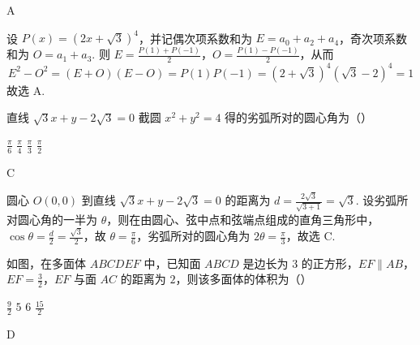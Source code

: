 \begin{answer}
A
\end{answer}

\begin{solution}
设 \(P(x)=(2x+\sqrt{3})^4\)，并记偶次项系数和为 \(E=a_0+a_2+a_4\)，奇次项系数和为 \(O=a_1+a_3\). 则
\(E=\frac{P(1)+P(-1)}{2}\)，\(O=\frac{P(1)-P(-1)}{2}\)，从而
\[
E^2-O^2=(E+O)(E-O)=P(1)P(-1)=(2+\sqrt{3})^4(\sqrt{3}-2)^4=1
\]
故选 A.
\end{solution}

\begin{problem}
直线 \(\sqrt{3}x+y-2\sqrt{3}=0\) 截圆 \(x^{2}+y^{2}=4\) 得的劣弧所对的圆心角为（\quad）

\choices
    {\(\frac{\pi}{6}\)}
    {\(\frac{\pi}{4}\)}
    {\(\frac{\pi}{3}\)}
    {\(\frac{\pi}{2}\)}
\end{problem}

\begin{answer}
C
\end{answer}

\begin{solution}
圆心 \(O(0,0)\) 到直线 \(\sqrt{3}x+y-2\sqrt{3}=0\) 的距离为
\(d=\frac{2\sqrt{3}}{\sqrt{3+1}}=\sqrt{3}\).
设劣弧所对圆心角的一半为 \(\theta\)，则在由圆心、弦中点和弦端点组成的直角三角形中，
\(\cos\theta=\frac{d}{2}=\frac{\sqrt{3}}{2}\)，故 \(\theta=\frac{\pi}{6}\)，劣弧所对的圆心角为 \(2\theta=\frac{\pi}{3}\)，故选 C.
\end{solution}

\begin{problem}
如图，在多面体 \(ABCDEF\) 中，已知面 \(ABCD\) 是边长为 \(3\) 的正方形，\(EF\parallel AB\)，\(EF=\frac{3}{2}\)，\(EF\) 与面 \(AC\) 的距离为 \(2\)，则该多面体的体积为（\quad）


\choices
    {\(\frac{9}{2}\)}
    {\(5\)}
    {\(6\)}
    {\(\frac{15}{2}\)}
\end{problem}

\begin{answer}
D
\end{answer}

